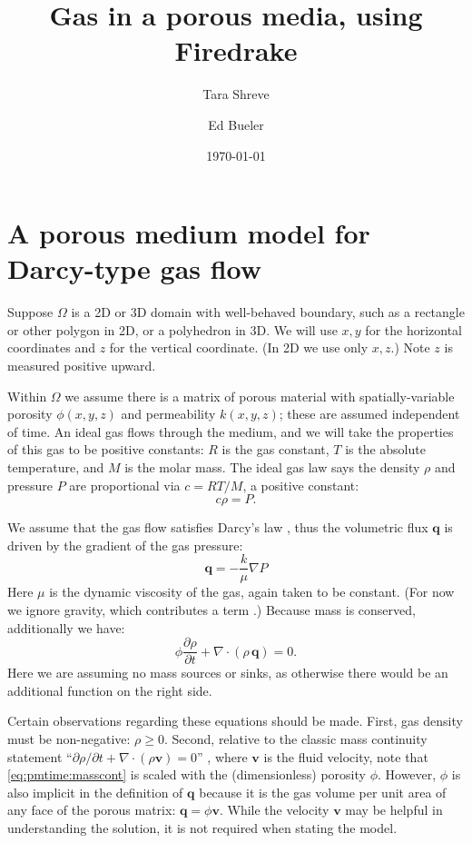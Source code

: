 \documentclass[11pt]{amsart}
\title{Gas in a porous media, using Firedrake}
\author{Tara Shreve}
\author{Ed Bueler}
\date{\today}
\newcommand{\bq}{\mathbf{q}}
\newcommand{\bv}{\mathbf{v}}
\newcommand{\Div}{\nabla\cdot}
\newcommand{\grad}{\nabla}
\begin{document}
\maketitle

\thispagestyle{empty}

\section{A porous medium model for Darcy-type gas flow}

Suppose $\Omega$ is a 2D or 3D domain with well-behaved boundary, such as a rectangle or other polygon in 2D, or a polyhedron in 3D.  We will use $x,y$ for the horizontal coordinates and $z$ for the vertical coordinate.  (In 2D we use only $x,z$.)  Note $z$ is measured positive upward.

Within $\Omega$ we assume there is a matrix of porous material with spatially-variable porosity $\phi(x,y,z)$ and permeability $k(x,y,z)$; these are assumed independent of time.  An ideal gas flows through the medium, and we will take the properties of this gas to be positive constants: $R$ is the gas constant, $T$ is the absolute temperature, and $M$ is the molar mass.  The ideal gas law says the density $\rho$ and pressure $P$ are proportional via $c = RT/M$, a positive constant:
\begin{equation}
c \rho = P.  \label{eq:ideal}
\end{equation}

We assume that the gas flow satisfies Darcy's law \citep{Fowler2011}, thus the volumetric flux $\bq$ is driven by the gradient of the gas pressure:
\begin{equation}
\bq = - \frac{k}{\mu} \grad P \label{eq:pmtime:darcy}
\end{equation}
Here $\mu$ is the dynamic viscosity of the gas, again taken to be constant.  (For now we ignore gravity, which contributes a term \citep{Collinson2012}.)  Because mass is conserved, additionally we have:
\begin{equation}
\phi \frac{\partial \rho}{\partial t} + \Div \left(\rho\, \bq\right) = 0. \label{eq:pmtime:masscont}
\end{equation}
Here we are assuming no mass sources or sinks, as otherwise there would be an additional function on the right side.

Certain observations regarding these equations should be made.  First, gas density must be non-negative: $\rho\ge 0$.  Second, relative to the classic mass continuity statement ``$\partial\rho/\partial t + \Div(\rho \bv)=0$'' \citep[for example]{Tadmor2012}, where $\bv$ is the fluid velocity, note that \eqref{eq:pmtime:masscont} is scaled with the (dimensionless) porosity $\phi$.  However, $\phi$ is also implicit in the definition of $\bq$ because it is the gas volume per unit area of any face of the porous matrix: $\bq = \phi \bv$.  While the velocity $\bv$ may be helpful in understanding the solution, it is not required when stating the model.
\end{document}
